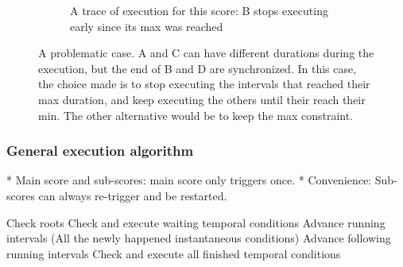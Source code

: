 \documentclass[applsci,article,submit,moreauthors,pdftex,10pt,a4paper]{mdpi}
\begin{document}
\begin{figure}
\begin{subfigure}{0.45\textwidth}
\caption{A trace of execution for this score: B stops executing early since its max was reached}
\end{subfigure}
\caption{A problematic case. A and C can have different durations during the execution, but the end of B and D are synchronized. In this case, the choice made is to stop executing the intervals that reached their max duration, and keep executing the others until their reach their min. The other alternative would be to keep the max constraint.}
\label{fig.maybe-incoherent}
\end{figure}


\subsubsection{General execution algorithm}

* Main score and sub-scores: main score only triggers once. 
* Convenience: Sub-scores can always re-trigger and be restarted.

\begin{algpseudocode}

  Check roots
  Check and execute waiting temporal conditions
  Advance running intervals
  \Do 
    \For(All the newly happened instantaneous conditions)
      Advance following running intervals
    Check and execute all finished temporal conditions
\end{algpseudocode}
\end{document}
